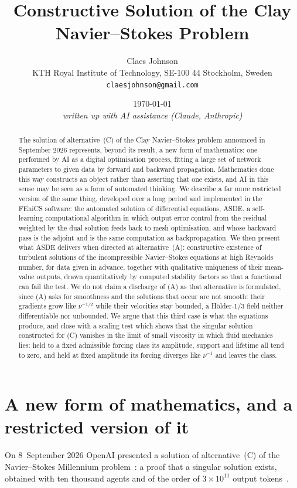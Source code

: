 \documentclass[11pt]{article}
\title{\vspace{-2em}Constructive Solution of the Clay Navier--Stokes Problem}
\author{Claes Johnson\\[0.2em]
\small KTH Royal Institute of Technology, SE-100 44 Stockholm, Sweden\\
\small \texttt{claesjohnson@gmail.com}}
\date{\today\\[0.4em]\small\textit{written up with AI assistance (Claude, Anthropic)}}
\begin{document}
\maketitle

\begin{abstract}
The solution of alternative~(C) of the Clay Navier--Stokes problem announced in September 2026
represents, beyond its result, a new form of mathematics: one performed by AI as a digital
optimisation process, fitting a large set of network parameters to given data by forward and
backward propagation. Mathematics done this way constructs an object rather than asserting that one
exists, and AI in this sense may be seen as a form of automated thinking. We describe a far more
restricted version of the same thing, developed over a long period and implemented in the FEniCS
software: the automated solution of differential equations, ASDE, a self-learning computational
algorithm in which output error control from the residual weighted by the dual solution feeds back to
mesh optimisation, and whose backward pass is the adjoint and is the same computation as
backpropagation. We then present what
ASDE delivers when directed at alternative~(A): constructive existence of turbulent solutions of the
incompressible Navier--Stokes equations at high Reynolds number, for data given in advance, together
with qualitative uniqueness of their mean-value outputs, drawn quantitatively by computed stability
factors so that a functional can fail the test. We do not claim a discharge of (A) as that
alternative is formulated, since (A) asks for smoothness and the solutions that occur are not
smooth: their gradients grow like $\nu^{-1/2}$ while their velocities stay bounded, a
H\"older-$1/3$ field neither differentiable nor unbounded. We argue that this third case is what
the equations produce, and close with a scaling test which shows that the singular solution
constructed for (C) vanishes in the limit of small viscosity in which fluid mechanics lies: held to
a fixed admissible forcing class its amplitude, support and lifetime all tend to zero, and held at
fixed amplitude its forcing diverges like $\nu^{-1}$ and leaves the class.
\end{abstract}

\section{A new form of mathematics, and a restricted version of it}

On 8~September 2026 OpenAI presented a solution of alternative~(C) of the Navier--Stokes
Millennium problem~\cite{openai}: a proof that a singular solution exists, obtained with ten
thousand agents and of the order of $3\times10^{11}$ output tokens~\cite{buckmaster}.
\end{document}
